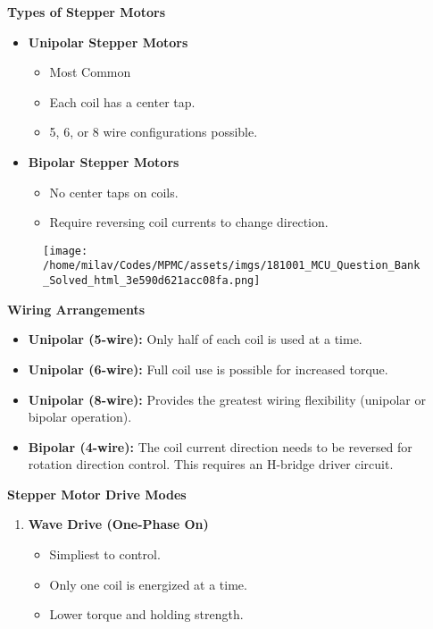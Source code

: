 \documentclass[
]{article}
\begin{document}
\textbf{Types of Stepper Motors}

\begin{itemize}
\item
  \textbf{Unipolar Stepper Motors}

  \begin{itemize}
  \item
    Most Common
  \item
    Each coil has a center tap.
  \item
    5, 6, or 8 wire configurations possible.
  \end{itemize}
\item
  \textbf{Bipolar Stepper Motors}

  \begin{itemize}
  \item
    No center taps on coils.
  \item
    Require reversing coil currents to change direction.
  \end{itemize}
\end{itemize}

\begin{figure}
\centering
\texttt{[image: /home/milav/Codes/MPMC/assets/imgs/181001\_MCU\_Question\_Bank\_Solved\_html\_3e590d621acc08fa.png]}
\caption{}
\end{figure}

\textbf{Wiring Arrangements}

\begin{itemize}
\item
  \textbf{Unipolar (5-wire):} Only half of each coil is used at a time.
\item
  \textbf{Unipolar (6-wire):} Full coil use is possible for increased
  torque.
\item
  \textbf{Unipolar (8-wire):} Provides the greatest wiring flexibility
  (unipolar or bipolar operation).
\item
  \textbf{Bipolar (4-wire):} The coil current direction needs to be
  reversed for rotation direction control. This requires an H-bridge
  driver circuit.
\end{itemize}

\textbf{Stepper Motor Drive Modes}

\begin{enumerate}
\def\labelenumi{\arabic{enumi}.}
\item
  \textbf{Wave Drive (One-Phase On)}

  \begin{itemize}
  \item
    Simpliest to control.
  \item
    Only one coil is energized at a time.
  \item
    Lower torque and holding strength.
  \end{itemize}
\end{enumerate}
\end{document}
